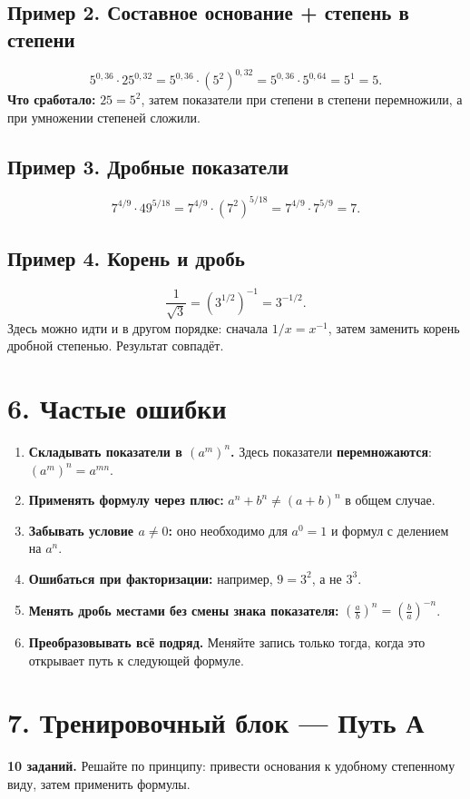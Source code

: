 \documentclass[a4paper,12pt]{article}
\newcommand{\term}[1]{\textbf{\color{darkaccent}#1}}
\begin{document}
\subsection*{Пример 2. Составное основание + степень в степени}
\[
5^{0{,}36}\cdot25^{0{,}32}
=5^{0{,}36}\cdot\left(5^2\right)^{0{,}32}
=5^{0{,}36}\cdot5^{0{,}64}
=5^1
=5.
\]
\textbf{Что сработало:} $25=5^2$, затем показатели при степени в степени перемножили, а при умножении степеней сложили.

\subsection*{Пример 3. Дробные показатели}
\[
7^{4/9}\cdot49^{5/18}
=7^{4/9}\cdot\left(7^2\right)^{5/18}
=7^{4/9}\cdot7^{5/9}
=7.
\]

\subsection*{Пример 4. Корень и дробь}
\[
\frac1{\sqrt3}
=\left(3^{1/2}\right)^{-1}
=3^{-1/2}.
\]
Здесь можно идти и в другом порядке: сначала $1/x=x^{-1}$, затем заменить корень дробной степенью. Результат совпадёт.

\section*{6. Частые ошибки}
\begin{enumerate}
  \item \textbf{Складывать показатели в $(a^m)^n$.} Здесь показатели \term{перемножаются}: $(a^m)^n=a^{mn}$.
  \item \textbf{Применять формулу через плюс:} $a^n+b^n\ne(a+b)^n$ в общем случае.
  \item \textbf{Забывать условие $a\ne0$:} оно необходимо для $a^0=1$ и формул с делением на $a^n$.
  \item \textbf{Ошибаться при факторизации:} например, $9=3^2$, а не $3^3$.
  \item \textbf{Менять дробь местами без смены знака показателя:} $\left(\frac ab\right)^n=\left(\frac ba\right)^{-n}$.
  \item \textbf{Преобразовывать всё подряд.} Меняйте запись только тогда, когда это открывает путь к следующей формуле.
\end{enumerate}

\clearpage

\section*{7. Тренировочный блок — Путь А}
\textbf{10 заданий.} Решайте по принципу: привести основания к удобному степенному виду, затем применить формулы.
\end{document}
